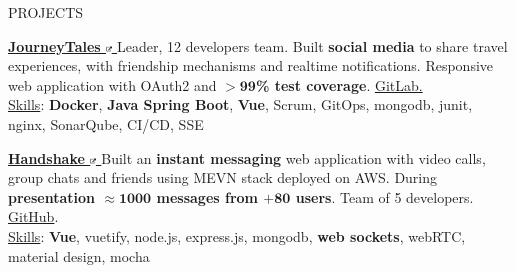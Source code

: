 \documentclass{cv} %
\def\intraexpvspace{0.15cm}
\begin{document}
\newpage
\begin{rSection}{PROJECTS}
    \vspace{-1.25em}
    \item \textbf{\href{https://pufferfish.sa4.usi.ch/login}
        {
            JourneyTales
            \includegraphics[width=0.15cm, trim={10cm -10cm 0cm 0cm}]{ext-link-icon.png}
        }}
    {Leader, 12 developers team.
        Built \textbf{social media} to share travel experiences,
        with friendship mechanisms and realtime notifications.
        Responsive web application with OAuth2 and $\boldsymbol{> 99}$\textbf{\% test coverage}.
        \href{https://gitlab.com/usi-si-oss/teaching/projects-showcase/sa4/team-4-pufferfish}{GitLab.}
    }\\[0.1cm]
    \hspace*{0.5cm}\underline{Skills}:
    \textbf{Docker},
    \textbf{Java Spring Boot},
    \textbf{Vue},
    Scrum,
    GitOps,
    mongodb,
    junit,
    nginx,
    SonarQube,
    CI/CD,
    SSE

    \vspace{\intraexpvspace}
    \item \textbf{\href{https://handshakeapp.ch}{
            Handshake
            \includegraphics[width=0.15cm, trim={10cm -10cm 0cm 0cm}]{ext-link-icon.png}
        }}
    {Built an \textbf{instant messaging} web application with video calls, group chats and friends
        using MEVN stack deployed on AWS.
        During \textbf{presentation $\boldsymbol{\approx1000}$ messages from $\boldsymbol{+80}$ users}.
        Team of 5 developers.
        \href{https://github.com/ogs-at-usi/handshake}{GitHub}.
    }\\[0.1cm]
    \hspace*{0.5cm}\underline{Skills}:
    \textbf{Vue},
    vuetify,
    node.js,
    express.js,
    mongodb,
    \textbf{web sockets},
    webRTC, %
    material design,
    mocha
\end{rSection}
\end{document}

